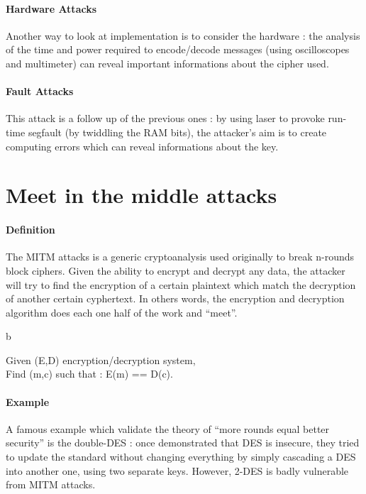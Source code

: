 \paragraph{Hardware Attacks \\}
Another way to look at implementation is to consider the hardware : the analysis of the time and power required to encode/decode messages (using oscilloscopes and multimeter) can reveal important informations about the cipher used.

\paragraph{Fault Attacks \\}
This attack is a follow up of the previous ones : by using laser to provoke run-time segfault (by twiddling the RAM bits), the attacker's aim is to create computing errors which can reveal informations about the key.

\section{Meet in the middle attacks}

\paragraph{Definition\\}
The MITM attacks is a generic cryptoanalysis used originally to break n-rounds block ciphers. Given the ability to encrypt and decrypt any data, the attacker will try to find the encryption of a certain plaintext which match the decryption of another certain cyphertext. In others words, the encryption and decryption algorithm does each one half of the work and ``meet''.

\begin{mydef}
b \newline
\begin{minipage}[t]{0.8\textwidth}
	Given (E,D) encryption/decryption system, \\
    Find (m,c) such that : E(m) == D(c).
\end{minipage}
\end{mydef}

\paragraph{Example}

A famous example which validate the theory of ``more rounds equal better security'' is the double-DES : once demonstrated that DES is insecure, they tried to update the standard without changing everything by simply cascading a DES into another one, using two separate keys. However, 2-DES is badly vulnerable from MITM attacks.

